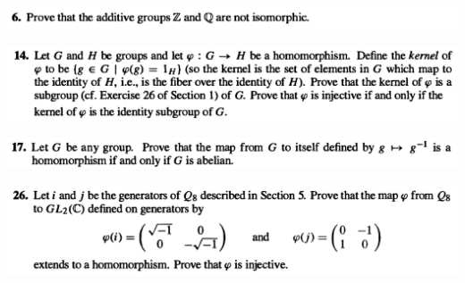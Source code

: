 \begin{mdframed}
\includegraphics[width=400pt]{img/abstract-algebra--nf--3-89f3.png}
\end{mdframed}


\begin{mdframed}
\includegraphics[width=400pt]{img/abstract-algebra--nf--3-b601.png}
\end{mdframed}

\begin{mdframed}
\includegraphics[width=400pt]{img/abstract-algebra--nf--3-b28c.png}
\end{mdframed}


\begin{mdframed}
\includegraphics[width=400pt]{img/abstract-algebra--nf--3-1a71.png}
\end{mdframed}
